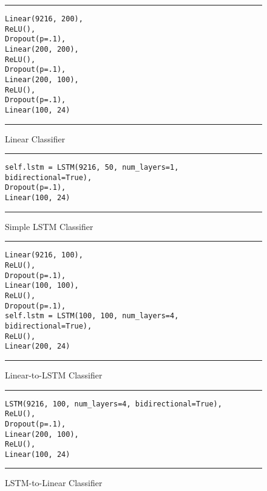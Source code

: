 \begin{figure}
  \caption{Linear Classifier}
  \label{fig:nnLinear}
  \par\noindent\rule{\textwidth}{0.5pt}
  \begin{\codefigsize}
  \begin{lstlisting}
Linear(9216, 200),
ReLU(),
Dropout(p=.1),
Linear(200, 200),
ReLU(),
Dropout(p=.1),
Linear(200, 100),
ReLU(),
Dropout(p=.1),
Linear(100, 24)
  \end{lstlisting}
  \end{\codefigsize}
  \par\noindent\rule{\textwidth}{0.5pt}
\end{figure}

\begin{figure}
  \caption{Simple LSTM Classifier}
  \label{fig:nnSimpleLSTM}
  \par\noindent\rule{\textwidth}{0.5pt}
  \begin{\codefigsize}
  \begin{lstlisting}
self.lstm = LSTM(9216, 50, num_layers=1, bidirectional=True),
Dropout(p=.1),
Linear(100, 24)
  \end{lstlisting}
  \end{\codefigsize}
  \par\noindent\rule{\textwidth}{0.5pt}
\end{figure}

\begin{figure}
  \caption{Linear-to-LSTM Classifier}
  \label{fig:nnLinear2LSTM}
  \par\noindent\rule{\textwidth}{0.5pt}
  \begin{\codefigsize}
  \begin{lstlisting}
Linear(9216, 100),
ReLU(),
Dropout(p=.1),
Linear(100, 100),
ReLU(),
Dropout(p=.1),
self.lstm = LSTM(100, 100, num_layers=4, bidirectional=True),
ReLU(),
Linear(200, 24)
  \end{lstlisting}
  \end{\codefigsize}
  \par\noindent\rule{\textwidth}{0.5pt}
\end{figure}

\begin{figure}
  \caption{LSTM-to-Linear Classifier}
  \label{fig:nnLSTM2Linear}
  \par\noindent\rule{\textwidth}{0.5pt}
  \begin{\codefigsize}
  \begin{lstlisting}
LSTM(9216, 100, num_layers=4, bidirectional=True),
ReLU(),
Dropout(p=.1),
Linear(200, 100),
ReLU(),
Linear(100, 24)
  \end{lstlisting}
  \end{\codefigsize}
  \par\noindent\rule{\textwidth}{0.5pt}
\end{figure}
